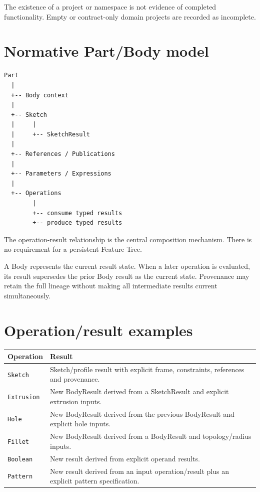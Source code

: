 \documentclass[11pt,a4paper]{report}
\begin{document}
The existence of a project or namespace is not evidence of completed functionality. Empty or contract-only domain projects are recorded as incomplete.

\section{Normative Part/Body model}

\begin{lstlisting}
Part
  |
  +-- Body context
  |
  +-- Sketch
  |     |
  |     +-- SketchResult
  |
  +-- References / Publications
  |
  +-- Parameters / Expressions
  |
  +-- Operations
        |
        +-- consume typed results
        +-- produce typed results
\end{lstlisting}

The operation-result relationship is the central composition mechanism. There is no requirement for a persistent Feature Tree.

A Body represents the current result state. When a later operation is evaluated, its result supersedes the prior Body result as the current state. Provenance may retain the full lineage without making all intermediate results current simultaneously.

\section{Operation/result examples}

\begin{tabularx}{\textwidth}{@{}lX@{}}
\toprule
Operation & Result \\
\midrule
\texttt{Sketch} & Sketch/profile result with explicit frame, constraints, references and provenance. \\
\texttt{Extrusion} & New BodyResult derived from a SketchResult and explicit extrusion inputs. \\
\texttt{Hole} & New BodyResult derived from the previous BodyResult and explicit hole inputs. \\
\texttt{Fillet} & New BodyResult derived from a BodyResult and topology/radius inputs. \\
\texttt{Boolean} & New result derived from explicit operand results. \\
\texttt{Pattern} & New result derived from an input operation/result plus an explicit pattern specification. \\
\bottomrule
\end{tabularx}
\end{document}
